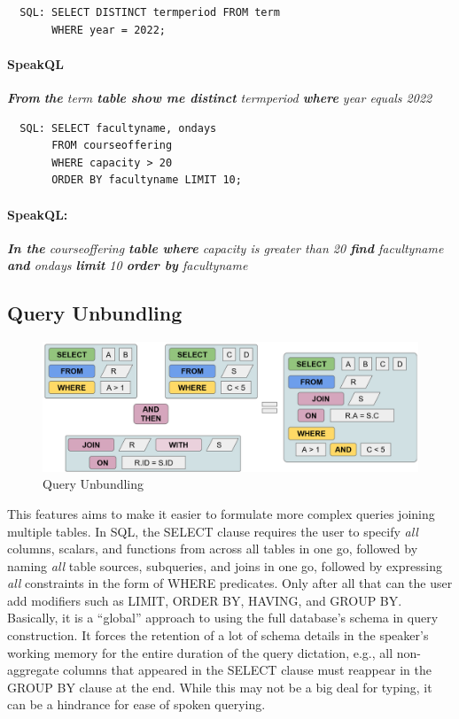 \begin{verbatim}
  SQL: SELECT DISTINCT termperiod FROM term 
       WHERE year = 2022;
\end{verbatim}
\paragraph{SpeakQL} \emph{\textbf{From} \textbf{the} term \textbf{table show me distinct} termperiod  \textbf{where} year equals 2022}

\vspace{2mm}
\begin{verbatim}
  SQL: SELECT facultyname, ondays 
       FROM courseoffering 
       WHERE capacity > 20 
       ORDER BY facultyname LIMIT 10;
\end{verbatim}
\paragraph{SpeakQL:} \emph{\textbf{In the} courseoffering \textbf{table where} capacity is greater than 20 \textbf{find} facultyname \textbf{and} ondays \textbf{limit} 10 \textbf{order by} facultyname}


\subsection{Query Unbundling}

\begin{figure}[ht]
  \centering
  \includegraphics[width=0.6\linewidth]{figures/unbundling_1.png}
  \caption{Query Unbundling}
  \label{fig:unbundling}
\end{figure}

This features aims to make it easier to formulate more complex queries joining multiple tables. 
In SQL, the SELECT clause requires the user to specify \textit{all} columns, scalars, and functions from across all tables in one go, followed by naming \textit{all} table sources, subqueries, and joins in one go, followed by expressing \textit{all} constraints in the form of WHERE predicates. 
Only after all that can the user add modifiers such as LIMIT, ORDER BY, HAVING, and GROUP BY. 
Basically, it is a ``global'' approach to using the full database's schema in query construction.
It forces the retention of a lot of schema details in the speaker's working memory for the entire duration of the query dictation, e.g., all non-aggregate columns that appeared in the SELECT clause must reappear in the GROUP BY clause at the end.
While this may not be a big deal for typing, it can be a hindrance for ease of spoken querying.

